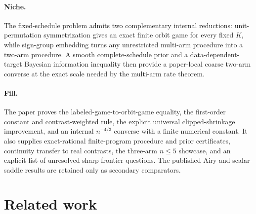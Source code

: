 \documentclass{article}
\begin{document}
\paragraph{Niche.} The fixed-schedule problem admits two complementary internal reductions: unit-permutation symmetrization gives an exact finite orbit game for every fixed \(K\), while sign-group embedding turns any unrestricted multi-arm procedure into a two-arm procedure. A smooth complete-schedule prior and a data-dependent-target Bayesian information inequality then provide a paper-local coarse two-arm converse at the exact scale needed by the multi-arm rate theorem.

\paragraph{Fill.} The paper proves the labeled-game-to-orbit-game equality, the first-order constant and contrast-weighted rule, the explicit universal clipped-shrinkage improvement, and an internal \(n^{-4/3}\) converse with a finite numerical constant. It also supplies exact-rational finite-program procedure and prior certificates, continuity transfer to real contrasts, the three-arm \(n\leq5\) showcase, and an explicit list of unresolved sharp-frontier questions. The published Airy and scalar-saddle results are retained only as secondary comparators.

\section{Related work}
\end{document}
